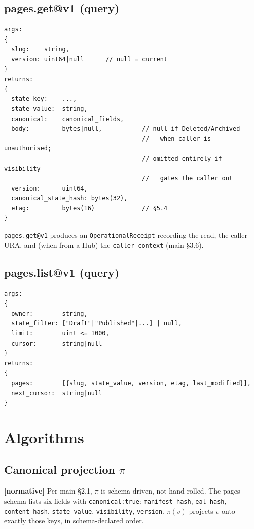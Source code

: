 \documentclass[11pt,a4paper]{article}
\newcommand{\normsv}{\textcolor{normativecolor}{\textbf{[normative]}}\xspace}
\theoremstyle{definition}
\begin{document}
\subsection{pages.get@v1 (query)}

\begin{lstlisting}
args:
{
  slug:    string,
  version: uint64|null      // null = current
}
returns:
{
  state_key:    ...,
  state_value:  string,
  canonical:    canonical_fields,
  body:         bytes|null,           // null if Deleted/Archived
                                      //   when caller is unauthorised;
                                      // omitted entirely if visibility
                                      //   gates the caller out
  version:      uint64,
  canonical_state_hash: bytes(32),
  etag:         bytes(16)             // §5.4
}
\end{lstlisting}

\texttt{pages.get@v1} produces an \texttt{OperationalReceipt}
recording the read, the caller URA, and (when from a Hub) the
\texttt{caller\_context} (main \S3.6).

\subsection{pages.list@v1 (query)}

\begin{lstlisting}
args:
{
  owner:        string,
  state_filter: ["Draft"|"Published"|...] | null,
  limit:        uint <= 1000,
  cursor:       string|null
}
returns:
{
  pages:        [{slug, state_value, version, etag, last_modified}],
  next_cursor:  string|null
}
\end{lstlisting}

\section{Algorithms}
\label{sec:algorithms}

\subsection{Canonical projection $\pi$}

\normsv{} Per main \S2.1, $\pi$ is schema-driven, not hand-rolled.
The pages schema lists six fields with
\texttt{canonical:true}: \texttt{manifest\_hash},
\texttt{eal\_hash}, \texttt{content\_hash}, \texttt{state\_value},
\texttt{visibility}, \texttt{version}. $\pi(v)$ projects $v$ onto
exactly those keys, in schema-declared order.
\end{document}
